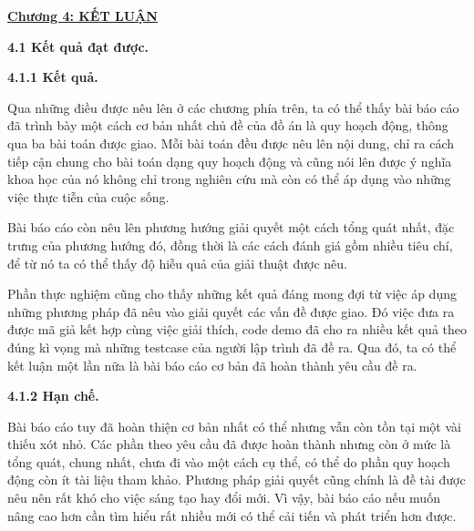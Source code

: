 \newpage
\changefontsizes{16pt}
\centerline{\textbf{\hyperlink{page.7}{Chương 4: KẾT LUẬN}}}


%
\bigskip
\changefontsizes{14pt}

\setlength{\parindent}{0.0cm}
\textbf{4.1 Kết quả đạt được.}

\smallskip
\changefontsizes{14pt}
\setlength{\parindent}{0.5cm}
\textbf{4.1.1 Kết quả.}

\smallskip
\changefontsizes{13pt}


\setlength{\parindent}{1cm}
Qua những điều được nêu lên ở các chương phía trên, ta có thể thấy bài báo cáo đã trình bày một cách cơ bản nhất chủ đề của đồ án là quy hoạch động, thông qua ba bài toán được giao. Mỗi bài toán đều được nêu lên nội dung, chỉ ra cách tiếp cận chung cho bài toán dạng quy hoạch động và cũng nói lên được ý nghĩa khoa học của nó không chỉ trong nghiên cứu mà còn có thể áp dụng vào những việc thực tiễn của cuộc sống.

Bài báo cáo còn nêu lên phương hướng giải quyết một cách tổng quát nhất, đặc trưng của phương hướng đó, đồng thời là các cách đánh giá gồm nhiều tiêu chí, để từ nó ta có thể thấy độ hiễu quả của giải thuật được nêu.

Phần thực nghiệm cũng cho thấy những kết quả đáng mong đợi từ việc áp dụng những phương pháp đã nêu vào giải quyết các vấn đề được giao. Đó việc đưa ra được mã giả kết hợp cùng việc giải thích, code demo đã cho ra nhiều kết quả theo đúng kì vọng mà những testcase của người lập trình đã đề ra. Qua đó, ta có thể kết luận một lần nữa là bài báo cáo cơ bản đã hoàn thành yêu cầu đề ra.

\bigskip
\changefontsizes{14pt}

\setlength{\parindent}{0.5cm}
\textbf{4.1.2 Hạn chế.}

\smallskip
\changefontsizes{13pt}


\setlength{\parindent}{1cm}

Bài báo cáo tuy đã hoàn thiện cơ bản nhất có thể nhưng vẫn còn tồn tại một vài thiếu xót nhỏ. Các phần theo yêu cầu đã được hoàn thành nhưng còn ở mức là tổng quát, chung nhất, chưa đi vào một cách cụ thể, có thể do phần quy hoạch động còn ít tài liệu tham khảo. Phương pháp giải quyết cũng chính là đề tài được nêu nên rất khó cho việc sáng tạo hay đổi mới. Vì vậy, bài báo cáo nếu muốn nâng cao hơn cần tìm hiểu rất nhiều mới có thể cải tiến và phát triển hơn được.

